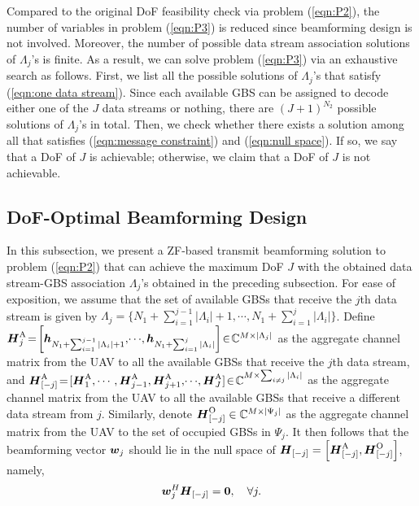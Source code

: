 \documentclass[onecolumn, draftclsnofoot, 12pt]{IEEEtran}
\newcommand{\mv}[1]{\mbox{\boldmath{$ #1 $}}}
\begin{document}
Compared to the original DoF feasibility check via problem (\ref{eqn:P2}), the number of variables in problem (\ref{eqn:P3}) is reduced since beamforming design is not involved. Moreover, the number of possible data stream association solutions of $\Lambda_j$'s is finite. As a result, we can solve problem (\ref{eqn:P3}) via an exhaustive search as follows. First, we list all the possible solutions of $\Lambda_j$'s that satisfy (\ref{eqn:one data stream}). Since each available GBS can be assigned to decode either one of the $J$ data streams or nothing, there are $(J+1)^{N_2}$ possible solutions of $\Lambda_j$'s in total. Then, we check whether there exists a solution among all that satisfies (\ref{eqn:message constraint}) and (\ref{eqn:null space}). If so, we say that a DoF of $J$ is achievable; otherwise, we claim that a DoF of $J$ is not achievable.


\subsection{DoF-Optimal Beamforming Design}\label{sec:Optimization 2}

In this subsection, we present a ZF-based transmit beamforming solution to problem (\ref{eqn:P2}) that can achieve the maximum DoF $J$ with the obtained data stream-GBS association $\Lambda_j$'s obtained in the preceding subsection. For ease of exposition, we assume that the set of available GBSs that receive the $j$th data stream is given by $\Lambda_j\!=\!\{N_1+\sum_{i=1}^{j-1}|\Lambda_i|+1,\!\cdots\!,N_1+\sum_{i=1}^{j}|\Lambda_i|\}$. Define ${\mv{H}}_{j}^{\mathrm{A}}\!=\!\left[{\mv{h}}_{N_1+\sum_{i=1}^{j-1}|\Lambda_i|+1},\!\cdots\!,{\mv{h}}_{N_1+\sum_{i=1}^{j}|\Lambda_i|}\right]\!\in\! \mathbb{C}^{M\times |\Lambda_j|}$ as the aggregate channel matrix from the UAV to all the available GBSs that receive the $j$th data stream, and ${\mv{H}}_{[-j]}^{\mathrm{A}}\!=\![{\mv{H}}_{1}^{\mathrm{A}},\cdots,{\mv{H}}_{j-1}^{\mathrm{A}},{\mv{H}}_{j+1}^{\mathrm{A}},\!\cdots\!,{\mv{H}}_{J}^{\mathrm{A}}]\!\in\! \mathbb{C}^{M\times \sum_{i\neq j}|\Lambda_i|}$ as the aggregate channel matrix from the UAV to all the available GBSs that receive a different data stream from $j$. Similarly, denote ${\mv{H}}_{[-j]}^{\mathrm{O}}\in \mathbb{C}^{M\times |\Psi_j|}$ as the aggregate channel matrix from the UAV to the set of occupied GBSs in $\Psi_j$. It then follows that the beamforming vector ${\mv{w}}_j$ should lie in the null space of ${\mv{H}}_{[-j]}=\left[{\mv{H}}_{[-j]}^{\mathrm{A}},{\mv{H}}_{[-j]}^{\mathrm{O}}\right]$, namely,
\begin{equation}\label{wj}
{\mv{w}}_j^H{\mv{H}}_{[-j]}={\mv{0}},\quad \forall j.
\end{equation}
\end{document}
